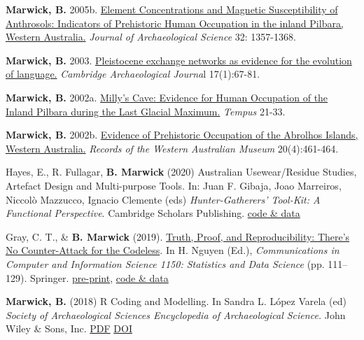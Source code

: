 \documentclass[11pt,article,oneside]{memoir}
\begin{document}
{{{{\ind \textbf{Marwick, B.} 2005b. \href{http://faculty.washington.edu/bmarwick/PDFs/Marwick_2005_JAS.pdf}{Element Concentrations and Magnetic Susceptibility of Anthrosols: Indicators of Prehistoric Human Occupation in the inland Pilbara, Western Australia.} \textit{Journal of Archaeological Science} 32: 1357-1368.

\ind \textbf{Marwick, B.} 2003. \href{http://faculty.washington.edu/bmarwick/PDFs/Marwick_2003_CAJ.pdf}{Pleistocene exchange networks as evidence for the evolution of language.} \textit{Cambridge Archaeological Journa}l 17(1):67-81.

\ind \textbf{Marwick, B.} 2002a. \href{http://faculty.washington.edu/bmarwick/PDFs/Marwick_2002_Tempus.pdf}{Milly's Cave: Evidence for Human Occupation of the Inland Pilbara during the Last Glacial Maximum.} \textit{Tempus} 21-33.

\ind \textbf{Marwick, B.} 2002b. \href{http://faculty.washington.edu/bmarwick/PDFs/Marwick_2002_RWAM.pdf}{Evidence of Prehistoric Occupation of the Abrolhos Islands, Western Australia.} \textit{Records of the Western Australian Museum} 20(4):461-464.

\bigskip


\ind Hayes, E., R. Fullagar, \textbf{B. Marwick} (2020) Australian Usewear/Residue Studies, Artefact Design and Multi-purpose Tools. In: Juan F. Gibaja, Joao Marreiros, Niccolò Mazzucco, Ignacio Clemente (eds) \textit{Hunter-Gatherers’ Tool-Kit: A Functional Perspective}. Cambridge Scholars Publishing. \href{https://doi.org/x10.17605/OSF.IO/MYBG2}{code \& data}

\ind Gray, C. T., \& \textbf{B. Marwick} (2019). \href{https://doi.org/10.1007/978-981-15-1960-4_8}{Truth, Proof, and Reproducibility: There’s No Counter-Attack for the Codeless}. In H. Nguyen (Ed.), \textit{Communications in Computer and Information Science 1150: Statistics and Data Science} (pp. 111–129). Springer.  \href{https://arxiv.org/abs/1907.05947}{pre-print}, \href{https://github.com/softloud/proof}{code \& data}

\ind \textbf{Marwick, B.} (2018) R Coding and Modelling. In Sandra L. López Varela (ed) \textit{Society of Archaeological Sciences Encyclopedia of Archaeological Science.}  John Wiley \& Sons, Inc. \href{http://faculty.washington.edu/bmarwick/PDFs/Marwick-2018-R-Coding-and-Modeling-The-Encyclopedia-of-Archaeological-Sciences.pdf}{PDF} \href{https://doi.org/10.1002/9781119188230.saseas0631}{DOI}

}}}}
\end{document}
